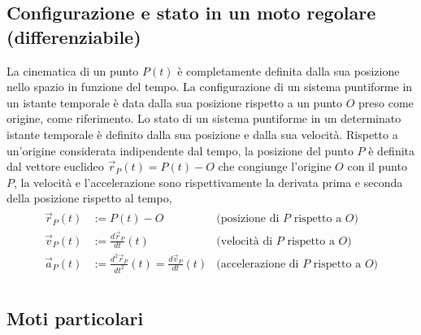 \documentclass[letterpaper,10pt,italian]{jupyterBook}
\begin{document}
\subsection{Configurazione e stato in un moto regolare (differenziabile)}
\label{\detokenize{ch/mechanics/kinematics-point:configurazione-e-stato-in-un-moto-regolare-differenziabile}}
\sphinxAtStartPar
La cinematica di un punto \(P(t)\) è completamente definita dalla sua posizione nello spazio in funzione del tempo. La configurazione di un sistema puntiforme in un istante temporale è data dalla sua posizione rispetto a un punto \(O\) preso come origine, come riferimento. Lo stato di un sistema puntiforme in un determinato istante temporale è definito dalla sua posizione e dalla sua velocità. Rispetto a un’origine considerata indipendente dal tempo, la posizione del punto \(P\) è definita dal vettore euclideo \(\vec{r}_P(t) = P(t) - O\) che congiunge l’origine \(O\) con il punto \(P\), la velocità e l’accelerazione sono rispettivamente la derivata prima e seconda della posizione rispetto al tempo,
\begin{equation*}
\begin{split}\begin{aligned}
   \vec{r}_P(t) & := P(t) - O & \text{(posizione di $P$ rispetto a $O$)} \\
   \vec{v}_P(t) & := \frac{d \vec{r}_P}{dt}(t) & \text{(velocità di $P$ rispetto a $O$)} \\
   \vec{a}_P(t) & := \frac{d^2 \vec{r}_P}{dt^2}(t) = \frac{d \vec{v}_P}{dt}(t) & \text{(accelerazione di $P$ rispetto a $O$)} \\
\end{aligned}\end{split}
\end{equation*}

\subsection{Moti particolari}
\label{\detokenize{ch/mechanics/kinematics-point:moti-particolari}}\label{\detokenize{ch/mechanics/kinematics-point:physics-hs-mechanics-kinematics-point-motion}}
\end{document}
